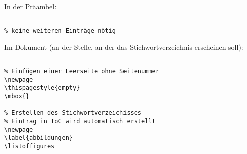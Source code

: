
In der Präambel:

\begin{verbatim}

% keine weiteren Einträge nötig

\end{verbatim}

\tcblower

Im Dokument (an der Stelle, an der das Stichwortverzeichnis erscheinen soll): 

\begin{verbatim}

% Einfügen einer Leerseite ohne Seitenummer
\newpage
\thispagestyle{empty}
\mbox{}

% Erstellen des Stichwortverzeichisses
% Eintrag in ToC wird automatisch erstellt
\newpage
\label{abbildungen}
\listoffigures


\end{verbatim}

